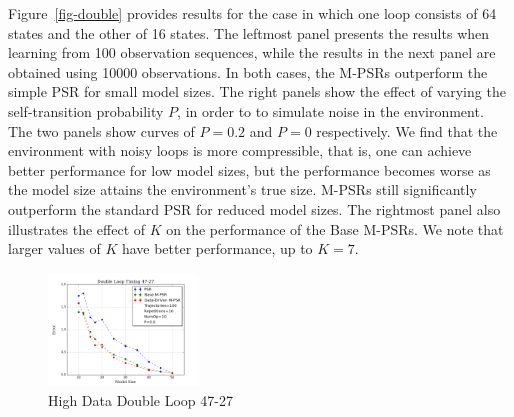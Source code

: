 \documentclass[letterpaper]{article}
\begin{document}

Figure~\ref{fig-double} provides results for the case in which one loop consists of 64 states and the other of 16 states. The leftmost panel presents the results when learning from  100 observation sequences, while the results in the next panel are obtained using 10000 observations. In both cases, the M-PSRs  outperform the simple PSR for small model sizes. The right panels show the effect of 
varying the self-transition probability $P$, in order to to simulate noise in the environment. The two panels show curves of $P=0.2$ and $P=0$ respectively. We find that the environment with noisy loops is more compressible, that is, one can achieve better performance for low model sizes, but the performance becomes worse as the model size attains the environment's true size. M-PSRs still significantly outperform the standard PSR for reduced model sizes.  The rightmost panel also illustrates the effect of $K$ on the performance of the Base M-PSRs. We note that larger values of $K$ have better performance, up to $K=7$.

\begin{figure}[ht!]
\centering
\includegraphics[width=40mm]{47-27-10000.png}\vspace*{-4mm}
\caption{High Data Double Loop 47-27\label{fig-dl47}\vspace*{-4mm}}
\end{figure}
\end{document}
